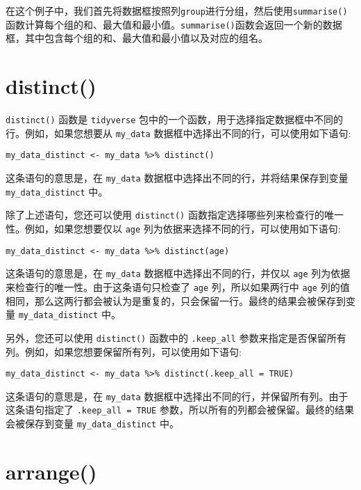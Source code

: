 \documentclass[
  letterpaper,
  DIV=11,
  numbers=noendperiod]{scrreprt}
\begin{document}
在这个例子中，我们首先将数据框按照列\texttt{group}进行分组，然后使用\texttt{summarise()}函数计算每个组的和、最大值和最小值。\texttt{summarise()}函数会返回一个新的数据框，其中包含每个组的和、最大值和最小值以及对应的组名。

\hypertarget{distinct}{%
\section{distinct()}\label{distinct}}

\texttt{distinct()} 函数是 \texttt{tidyverse}
包中的一个函数，用于选择指定数据框中不同的行。例如，如果您想要从
\texttt{my\_data} 数据框中选择出不同的行，可以使用如下语句:

\begin{verbatim}
my_data_distinct <- my_data %>% distinct()
\end{verbatim}

这条语句的意思是，在 \texttt{my\_data}
数据框中选择出不同的行，并将结果保存到变量 \texttt{my\_data\_distinct}
中。

除了上述语句，您还可以使用 \texttt{distinct()}
函数指定选择哪些列来检查行的唯一性。例如，如果您想要仅以 \texttt{age}
列为依据来选择不同的行，可以使用如下语句:

\begin{verbatim}
my_data_distinct <- my_data %>% distinct(age)
\end{verbatim}

这条语句的意思是，在 \texttt{my\_data} 数据框中选择出不同的行，并仅以
\texttt{age} 列为依据来检查行的唯一性。由于这条语句只检查了 \texttt{age}
列，所以如果两行中 \texttt{age}
列的值相同，那么这两行都会被认为是重复的，只会保留一行。最终的结果会被保存到变量
\texttt{my\_data\_distinct} 中。

另外，您还可以使用 \texttt{distinct()} 函数中的 \texttt{.keep\_all}
参数来指定是否保留所有列。例如，如果您想要保留所有列，可以使用如下语句:

\begin{verbatim}
my_data_distinct <- my_data %>% distinct(.keep_all = TRUE)
\end{verbatim}

这条语句的意思是，在 \texttt{my\_data}
数据框中选择出不同的行，并保留所有列。由于这条语句指定了
\texttt{.keep\_all\ =\ TRUE}
参数，所以所有的列都会被保留。最终的结果会被保存到变量
\texttt{my\_data\_distinct} 中。

\hypertarget{arrange}{%
\section{arrange()}\label{arrange}}
\end{document}
